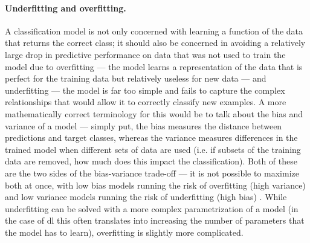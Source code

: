 \paragraph{Underfitting and overfitting.} A classification model is not only concerned with learning a function of the data that returns the correct class; it should also be concerned in avoiding a relatively large drop in predictive performance on data that was not used to train the model due to overfitting --- the model learns a representation of the data that is perfect for the training data but relatively useless for new data --- and underfitting --- the model is far too simple and fails to capture the complex relationships that would allow it to correctly classify new examples. A more mathematically correct terminology for this would be to talk about the bias and variance of a model --- simply put, the bias measures the distance between predictions and target classes, whereas the variance measures differences in the trained model when different sets of data are used (i.e. if subsets of the training data are removed, how much does this impact the classification). Both of these are the two sides of the bias-variance trade-off --- it is not possible to maximize both at once, with low bias models running the risk of overfitting (high variance) and low variance models running the risk of underfitting (high bias) \cite{James2013-py}. While underfitting can be solved with a more complex parametrization of a model (in the case of \ac{dl} this often translates into increasing the number of parameters that the model has to learn), overfitting is slightly more complicated.

